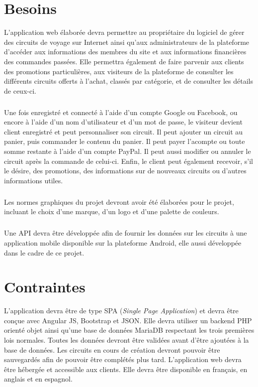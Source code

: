 \documentclass{scrreprt}
\begin{document}
\chapter{Besoins}
L’application web élaborée devra permettre au propriétaire du logiciel de gérer
des circuits de voyage sur Internet ainsi qu'aux
administrateurs de la plateforme d’accéder aux informations des membres du site
et aux informations financières des commandes passées. Elle permettra également
de faire parvenir aux clients des promotions particulières, aux visiteurs de la
plateforme de consulter les différents circuits offerts à l’achat, classés par
catégorie, et de consulter les détails de ceux-ci.

\paragraph{}
Une fois enregistré et connecté à l’aide d’un compte Google ou Facebook, ou
encore à l’aide d’un nom d’utilisateur et d’un mot de passe, le visiteur
devient client enregistré et peut personnaliser son circuit. Il peut ajouter un
circuit au panier, puis commander le contenu du panier. Il peut payer l’acompte
ou toute somme restante à l’aide d’un compte PayPal. Il peut aussi modifier ou
annuler le circuit après la commande de celui-ci. Enfin, le client peut
également recevoir, s’il le désire, des promotions, des informations sur de
nouveaux circuits ou d’autres informations utiles.

\paragraph{}
Les normes graphiques du projet devront avoir été élaborées pour le projet,
incluant le choix d’une marque, d’un logo et d’une palette de couleurs.

\paragraph{}
Une API devra être développée afin de fournir les données sur les circuits à une
application mobile disponible sur la plateforme Android, elle aussi développée
dans le cadre de ce projet.


\chapter{Contraintes}
L’application devra être de type SPA (\textit{Single Page Application}) et devra être conçue avec Angular
JS, Bootstrap et JSON. Elle devra utiliser un backend PHP orienté objet ainsi
qu’une base de données MariaDB respectant les trois premières lois normales.
Toutes les données devront être validées avant d’être ajoutées à la base
de données. Les circuits en cours de création devront pouvoir être sauvegardés
afin de pouvoir être complétés plus tard. L’application web devra être hébergée
et accessible aux clients. Elle devra être disponible en français, en anglais et
en espagnol.
\end{document}
